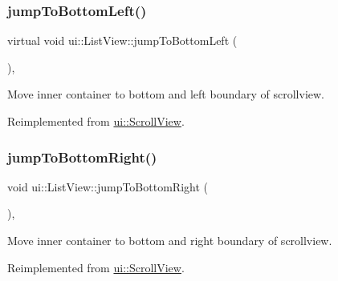 \mbox{\label{classui_1_1ListView_a001320a34234f830a4f35096ceb86d48}} 
\subsubsection{\texorpdfstring{jump\+To\+Bottom\+Left()}{jumpToBottomLeft()}\hspace{0.1cm}{\footnotesize\ttfamily [2/2]}}
{\footnotesize\ttfamily virtual void ui\+::\+List\+View\+::jump\+To\+Bottom\+Left (\begin{DoxyParamCaption}{ }\end{DoxyParamCaption})\hspace{0.3cm}{\ttfamily [override]}, {\ttfamily [virtual]}}

Move inner container to bottom and left boundary of scrollview. 

Reimplemented from \hyperlink{classui_1_1ScrollView_aa06afeba18463d129dfdc3a9352aaf4a}{ui\+::\+Scroll\+View}.

\mbox{\label{classui_1_1ListView_ac76553a765cff9931a56c75c75484650}} 
\subsubsection{\texorpdfstring{jump\+To\+Bottom\+Right()}{jumpToBottomRight()}\hspace{0.1cm}{\footnotesize\ttfamily [1/2]}}
{\footnotesize\ttfamily void ui\+::\+List\+View\+::jump\+To\+Bottom\+Right (\begin{DoxyParamCaption}{ }\end{DoxyParamCaption})\hspace{0.3cm}{\ttfamily [override]}, {\ttfamily [virtual]}}

Move inner container to bottom and right boundary of scrollview. 

Reimplemented from \hyperlink{classui_1_1ScrollView_a71e1de6f85955a4d4b96931244bffd22}{ui\+::\+Scroll\+View}.

\mbox{\label{classui_1_1ListView_a1147d7b2ad27eb3101bb6e31d1fe73e1}} 
